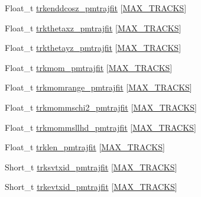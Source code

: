 \begin{DoxyCompactItemize}
\item 
Float\-\_\-t \hyperlink{classanatree_ac0bb16a328970bbfaf5956b525b2d253}{trkenddcosz\-\_\-pmtrajfit} \mbox{[}\hyperlink{anatree__core__v09410002_8h_a327fd4e796e4a0d78947524c96e4362e}{M\-A\-X\-\_\-\-T\-R\-A\-C\-K\-S}\mbox{]}
\item 
Float\-\_\-t \hyperlink{classanatree_ad53fc5e3baf134af1a6c5ff0e77319c1}{trkthetaxz\-\_\-pmtrajfit} \mbox{[}\hyperlink{anatree__core__v09410002_8h_a327fd4e796e4a0d78947524c96e4362e}{M\-A\-X\-\_\-\-T\-R\-A\-C\-K\-S}\mbox{]}
\item 
Float\-\_\-t \hyperlink{classanatree_a3cb86d98b107817c512e85bca2ad32cc}{trkthetayz\-\_\-pmtrajfit} \mbox{[}\hyperlink{anatree__core__v09410002_8h_a327fd4e796e4a0d78947524c96e4362e}{M\-A\-X\-\_\-\-T\-R\-A\-C\-K\-S}\mbox{]}
\item 
Float\-\_\-t \hyperlink{classanatree_a74fe2d3cfc1dad1efb636467ebb0d90d}{trkmom\-\_\-pmtrajfit} \mbox{[}\hyperlink{anatree__core__v09410002_8h_a327fd4e796e4a0d78947524c96e4362e}{M\-A\-X\-\_\-\-T\-R\-A\-C\-K\-S}\mbox{]}
\item 
Float\-\_\-t \hyperlink{classanatree_a2aeeeb27bbd68acf0a4c3d3f4b2ab82c}{trkmomrange\-\_\-pmtrajfit} \mbox{[}\hyperlink{anatree__core__v09410002_8h_a327fd4e796e4a0d78947524c96e4362e}{M\-A\-X\-\_\-\-T\-R\-A\-C\-K\-S}\mbox{]}
\item 
Float\-\_\-t \hyperlink{classanatree_af4bf7af4809c404814a1d84175d95339}{trkmommschi2\-\_\-pmtrajfit} \mbox{[}\hyperlink{anatree__core__v09410002_8h_a327fd4e796e4a0d78947524c96e4362e}{M\-A\-X\-\_\-\-T\-R\-A\-C\-K\-S}\mbox{]}
\item 
Float\-\_\-t \hyperlink{classanatree_ac0d1d2fc3fe6e48e81257c327f8f94bc}{trkmommsllhd\-\_\-pmtrajfit} \mbox{[}\hyperlink{anatree__core__v09410002_8h_a327fd4e796e4a0d78947524c96e4362e}{M\-A\-X\-\_\-\-T\-R\-A\-C\-K\-S}\mbox{]}
\item 
Float\-\_\-t \hyperlink{classanatree_ac99185ab75915de0b9003619a3fd7864}{trklen\-\_\-pmtrajfit} \mbox{[}\hyperlink{anatree__core__v09410002_8h_a327fd4e796e4a0d78947524c96e4362e}{M\-A\-X\-\_\-\-T\-R\-A\-C\-K\-S}\mbox{]}
\item 
Short\-\_\-t \hyperlink{classanatree_aeab61a1f293160bd323af37b3effe604}{trksvtxid\-\_\-pmtrajfit} \mbox{[}\hyperlink{anatree__core__v09410002_8h_a327fd4e796e4a0d78947524c96e4362e}{M\-A\-X\-\_\-\-T\-R\-A\-C\-K\-S}\mbox{]}
\item 
Short\-\_\-t \hyperlink{classanatree_a8812d0537b469650baebff4fbd339d46}{trkevtxid\-\_\-pmtrajfit} \mbox{[}\hyperlink{anatree__core__v09410002_8h_a327fd4e796e4a0d78947524c96e4362e}{M\-A\-X\-\_\-\-T\-R\-A\-C\-K\-S}\mbox{]}

\end{DoxyCompactItemize}
